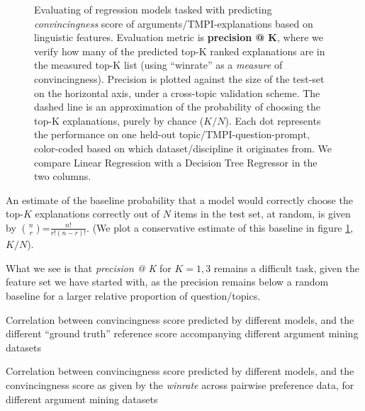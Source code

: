\documentclass[notitlepage,12pt]{jedm}
\begin{document}
\begin{figure}[H]
	\scalebox{0.5}{}
	\caption{
		Evaluating of regression models tasked with predicting 
		\textit{convincingness} score of arguments/TMPI-explanations based on 
		linguistic features.
		Evaluation metric is \textbf{precision @ K}, where we verify how many 
		of the predicted top-K ranked explanations are in the measured top-K 
		list (using ``winrate'' as a \textit{measure} of convincingness). 
		Precision is plotted against the size of the test-set on the horizontal 
		axis, under a cross-topic validation scheme.
		The dashed line is an approximation of the probability of 
		choosing the top-K explanations, purely by chance ($K/N$).
		Each dot represents the performance on one held-out 
		topic/TMPI-question-prompt, color-coded based on which 
		dataset/discipline it originates from.
		We compare Linear Regression with a Decision Tree Regressor in the two 
		columns.
	}
	\label{fig:prec_at_K}
\end{figure}

An estimate of the baseline probability that a model would correctly choose the 
top-$K$ explanations correctly out of $N$ items in the test set, at random, is 
given by $n\choose r$=$\frac{n!}{r!(n-r)!}$. 
(We plot a conservative estimate of this baseline in figure \ref{fig:prec_at_K},
$K/N$).

What we see is that \textit{precision @ K} for $K={1,3}$ remains a difficult 
task, given the feature set we have started with, as the precision remains 
below a random baseline for a larger relative proportion of question/topics.




\begin{table}
	\parbox{.45\linewidth}{
		\centering
		
	}
	\hfill
	\parbox{.45\linewidth}{
		\centering
		
	}
\caption{Correlation between convincingness score predicted by 
	different models, and the different ``ground truth'' reference score 
	accompanying different argument mining datasets}
\end{table}


\begin{table}
	\parbox{.45\linewidth}{
		\centering
		
	}
	\hfill
	\parbox{.45\linewidth}{
		\centering
		
	}
	\caption{Correlation between convincingness score predicted by 
		different models, and the convincingness score as given by the 
		\textit{winrate} across pairwise preference data, for different 
		argument mining datasets
	}
\end{table}
\end{document}
